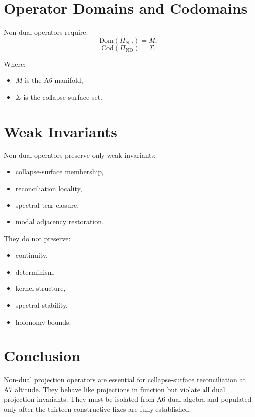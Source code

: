 \documentclass[11pt]{article}
\begin{document}
\section{Operator Domains and Codomains}

Non-dual operators require:
\[
\mathrm{Dom}(\Pi_{\mathrm{ND}}) = M,
\]
\[
\mathrm{Cod}(\Pi_{\mathrm{ND}}) = \Sigma.
\]

Where:
\begin{itemize}
  \item $M$ is the A6 manifold,
  \item $\Sigma$ is the collapse-surface set.
\end{itemize}

\section{Weak Invariants}

Non-dual operators preserve only weak invariants:
\begin{itemize}
  \item collapse-surface membership,
  \item reconciliation locality,
  \item spectral tear closure,
  \item modal adjacency restoration.
\end{itemize}

They do not preserve:
\begin{itemize}
  \item continuity,
  \item determinism,
  \item kernel structure,
  \item spectral stability,
  \item holonomy bounds.
\end{itemize}

\section{Conclusion}

Non-dual projection operators are essential for collapse-surface reconciliation
at A7 altitude. They behave like projections in function but violate all dual
projection invariants. They must be isolated from A6 dual algebra and populated
only after the thirteen constructive fixes are fully established.
\end{document}
